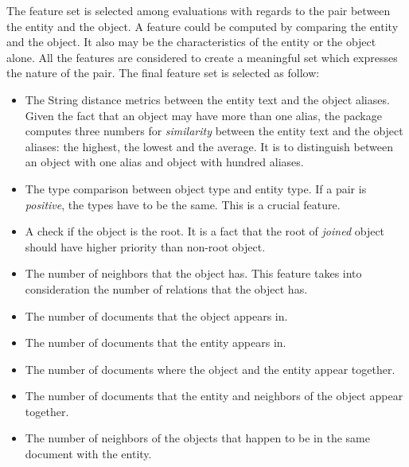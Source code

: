 The feature set is selected among evaluations with regards to the pair between
the entity and the object. A feature could be computed by comparing the entity 
and the object. It also may be the characteristics of the entity or the object 
alone. All the features are considered to create a meaningful set which
expresses the nature of the pair. The final feature set is selected 
as follow:

\begin{itemize}
\item The String distance metrics between the entity text and the object
aliases. Given the fact that an object may have more than one alias, the package
computes three numbers for \textit{similarity} between the entity text and the
object aliases: the highest, the lowest and the average. It is to distinguish
between an object with one alias and object with hundred aliases.
\item The type comparison between object type and entity type. If a pair is
\textit{positive}, the types have to be the same. This is a crucial feature. 
\item A check if the object is the root. It is a fact that the root of
\textit{joined} object should have higher priority than non-root object.
\item The number of neighbors that the object has. This feature takes into
consideration the number of relations that the object has.
\item The number of documents that the object appears in.
\item The number of documents that the entity appears in.
\item The number of documents where the object and the entity appear together.
\item The number of documents that the entity and neighbors of the object appear together.
\item The number of neighbors of the objects that happen to be in the same document with the entity.
\end{itemize}


